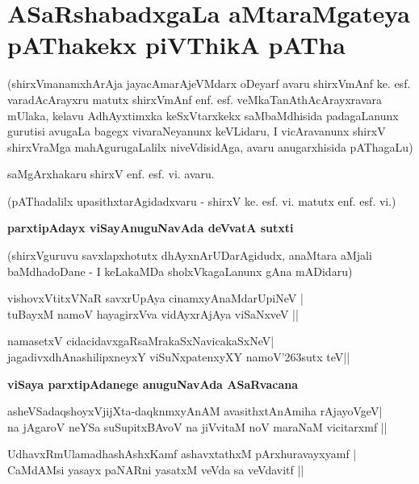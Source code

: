 {\chapter{ASaRshabadxgaLa aMtaraMgateya pAThakekx piVThikA pATha}}

\noindent
(shirxVmanamxhArAja jayacAmarAjeVMdarx oDeyarf avaru shirxVmAnf ke. esf. varadAcArayxru matutx shirxVmAnf enf. esf. veMkaTanAthAcArayxravara mUlaka, kelavu AdhAyxtimxka keSxVtarxkekx saMbaMdhisida padagaLanunx gurutisi avugaLa bagegx vivaraNeyanunx keVLidaru, I vicAravanunx shirxV shirxVraMga mahAgurugaLalilx niveVdisidAga, avaru   anugarxhisida pAThagaLu)

\medskip

\hfill{saMgArxhakaru shirxV enf. esf. vi. avaru.}

\medskip
\noindent
\centerline{(pAThadalilx upasithxtarAgidadxvaru - shirxV ke. esf. vi. matutx enf. esf. vi.)}

\bigskip
\noindent
{\large\bf parxtipAdayx viSayAnuguNavAda deVvatA sutxti}\label{page128}
\medskip

\noindent
(shirxVguruvu savxlapxhotutx dhAyxnArUDarAgidudx, anaMtara aMjali baMdhadoDane - I keLakaMDa sholxVkagaLanunx gAna mADidaru)


\begin{shloka}
vishovxVtitxVNaR savxrUpAya cinamxyAnaMdarUpiNeV |\\\label{128}
tuBayxM namoV hayagirxVva vidAyxrAjAya viSaNxveV ||
\end{shloka}
\begin{shloka}
namasetxV cidacidavxgaRsaMrakaSxNavicakaSxNeV|\\\label{128a}
jagadivxdhAnashilipxneyxY viSuNxpatenxyXY namoV\char'263sutx teV||
\end{shloka}


\newpage

\bigskip
\noindent
{\large\bf viSaya parxtipAdanege anuguNavAda ASaRvacana}

\begin{shloka}
asheVSadaqshoyxVjijXta-daqknmxyAnAM avasithxtAnAmiha rAjayoVgeV|\\\label{128b}
na jAgaroV neYSa suSupitxBAvoV na jiVvitaM noV maraNaM vicitarxmf ||
\end{shloka}
\begin{shloka}
UdhavxRmUlamadhashAshxKamf ashavxtathxM pArxhuravayxyamf |\\\label{128c}
CaMdAMsi yasayx paNARni yasatxM veVda sa veVdavitf ||
\end{shloka}

